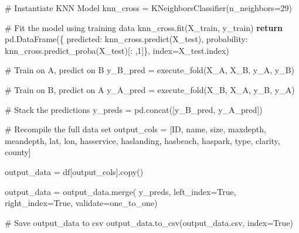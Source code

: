 \documentclass[
]{article}
\newenvironment{Shaded}{\begin{snugshade}}{\end{snugshade}}
\newcommand{\CommentTok}[1]{\textcolor[rgb]{0.37,0.37,0.37}{#1}}
\newcommand{\ControlFlowTok}[1]{\textcolor[rgb]{0.00,0.23,0.31}{\textbf{#1}}}
\newcommand{\DecValTok}[1]{\textcolor[rgb]{0.68,0.00,0.00}{#1}}
\newcommand{\NormalTok}[1]{\textcolor[rgb]{0.00,0.23,0.31}{#1}}
\newcommand{\OperatorTok}[1]{\textcolor[rgb]{0.37,0.37,0.37}{#1}}
\newcommand{\StringTok}[1]{\textcolor[rgb]{0.13,0.47,0.30}{#1}}
\newcommand{\VariableTok}[1]{\textcolor[rgb]{0.07,0.07,0.07}{#1}}
\begin{document}
\begin{Shaded}
\begin{Highlighting}[]
    \CommentTok{\# Instantiate KNN Model}
\NormalTok{    knn\_cross }\OperatorTok{=}\NormalTok{ KNeighborsClassifier(n\_neighbors}\OperatorTok{=}\DecValTok{29}\NormalTok{)}

    \CommentTok{\# Fit the model using training data}
\NormalTok{    knn\_cross.fit(X\_train, y\_train)}
    \ControlFlowTok{return}\NormalTok{ pd.DataFrame(\{}
        \StringTok{\textquotesingle{}predicted\textquotesingle{}}\NormalTok{: knn\_cross.predict(X\_test),}
        \StringTok{\textquotesingle{}probability\textquotesingle{}}\NormalTok{: knn\_cross.predict\_proba(X\_test)[: ,}\DecValTok{1}\NormalTok{]\},}
\NormalTok{        index}\OperatorTok{=}\NormalTok{X\_test.index)}

\CommentTok{\# Train on A, predict on B}
\NormalTok{y\_B\_pred }\OperatorTok{=}\NormalTok{ execute\_fold(X\_A, X\_B, y\_A, y\_B)}

\CommentTok{\# Train on B, predict on A}
\NormalTok{y\_A\_pred }\OperatorTok{=}\NormalTok{ execute\_fold(X\_B, X\_A, y\_B, y\_A)}

\CommentTok{\# Stack the predictions}
\NormalTok{y\_preds }\OperatorTok{=}\NormalTok{ pd.concat([y\_B\_pred, y\_A\_pred])}

\CommentTok{\# Recompile the full data set}
\NormalTok{output\_cols }\OperatorTok{=}\NormalTok{ [}\StringTok{\textquotesingle{}ID\textquotesingle{}}\NormalTok{, }\StringTok{\textquotesingle{}name\textquotesingle{}}\NormalTok{, }\StringTok{\textquotesingle{}size\textquotesingle{}}\NormalTok{, }\StringTok{\textquotesingle{}maxdepth\textquotesingle{}}\NormalTok{, }\StringTok{\textquotesingle{}meandepth\textquotesingle{}}\NormalTok{, }
       \StringTok{\textquotesingle{}lat\textquotesingle{}}\NormalTok{, }\StringTok{\textquotesingle{}lon\textquotesingle{}}\NormalTok{, }\StringTok{\textquotesingle{}hasservice\textquotesingle{}}\NormalTok{, }\StringTok{\textquotesingle{}haslanding\textquotesingle{}}\NormalTok{, }\StringTok{\textquotesingle{}hasbeach\textquotesingle{}}\NormalTok{, }
       \StringTok{\textquotesingle{}haspark\textquotesingle{}}\NormalTok{, }\StringTok{\textquotesingle{}type\textquotesingle{}}\NormalTok{, }\StringTok{\textquotesingle{}clarity\textquotesingle{}}\NormalTok{, }\StringTok{\textquotesingle{}county\textquotesingle{}}\NormalTok{]}

\NormalTok{output\_data }\OperatorTok{=}\NormalTok{ df[output\_cols].copy()}

\NormalTok{output\_data }\OperatorTok{=}\NormalTok{ output\_data.merge(}
\NormalTok{    y\_preds, left\_index}\OperatorTok{=}\VariableTok{True}\NormalTok{, right\_index}\OperatorTok{=}\VariableTok{True}\NormalTok{, }
\NormalTok{    validate}\OperatorTok{=}\StringTok{\textquotesingle{}one\_to\_one\textquotesingle{}}\NormalTok{)}

\CommentTok{\# Save output\_data to csv}
\NormalTok{output\_data.to\_csv(}\StringTok{\textquotesingle{}output\_data.csv\textquotesingle{}}\NormalTok{, index}\OperatorTok{=}\VariableTok{True}\NormalTok{)}
\end{Highlighting}
\end{Shaded}
\end{document}
